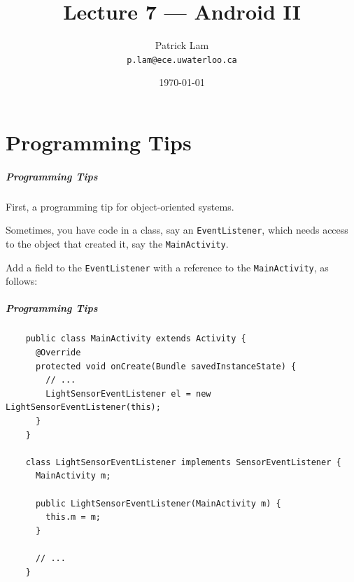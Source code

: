 

\title{Lecture 7 --- Android II}

\author{Patrick Lam\\ \small \texttt{p.lam@ece.uwaterloo.ca} }
\date{\today}


\begin{frame}
  \titlepage
\end{frame}

\part{Programming Tips}
\frame{\partpage}

\begin{frame}
\frametitle{Programming Tips}
\begin{changemargin}{1cm}

First, a programming tip for object-oriented systems. 

Sometimes, you have code
in a class, say an {\tt EventListener}, which needs access to the object
that created it, say the {\tt MainActivity}. 

Add a field to the {\tt EventListener}
with a reference to the {\tt MainActivity}, as follows:

\end{changemargin}
\end{frame}

\begin{frame}[fragile]
\frametitle{Programming Tips}
\begin{changemargin}{0.5cm}

{\scriptsize \begin{verbatim}
    public class MainActivity extends Activity {
      @Override
      protected void onCreate(Bundle savedInstanceState) {
        // ...
        LightSensorEventListener el = new LightSensorEventListener(this);
      }
    }

    class LightSensorEventListener implements SensorEventListener {
      MainActivity m;

      public LightSensorEventListener(MainActivity m) {
        this.m = m;
      }

      // ...
    }
\end{verbatim}
}

\end{changemargin}
\end{frame}

